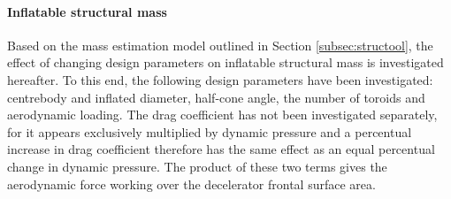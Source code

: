 \paragraph{Inflatable structural mass}

Based on the mass estimation model outlined in Section \ref{subsec:structool}, the effect of changing design parameters on inflatable structural mass is investigated hereafter. To this end, the following design parameters have been investigated: centrebody and inflated diameter, half-cone angle, the number of toroids and aerodynamic loading. The drag coefficient has not been investigated separately, for it appears exclusively multiplied by dynamic pressure and a percentual increase in drag coefficient therefore has the same effect as an equal percentual change in dynamic pressure. The product of these two terms gives the aerodynamic force working over the decelerator frontal surface area.

